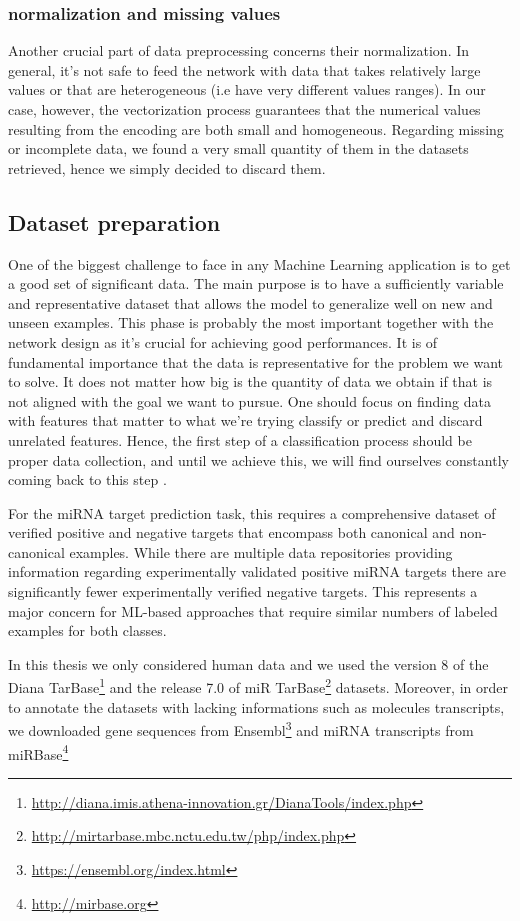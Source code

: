 \subsubsection{normalization and missing values}
Another crucial part of data preprocessing concerns their normalization. In general, it's not safe to feed the network with data that takes relatively large values or that are heterogeneous (i.e have very different values ranges). In our case, however, the vectorization process guarantees that the numerical values resulting from the encoding are both small and homogeneous. Regarding missing or incomplete data, we found a very small quantity  of them in the datasets retrieved, hence we simply decided to discard them.  

\subsection{Dataset preparation}
One of the biggest challenge to face in any Machine Learning application is to get a good set of significant data.
The main purpose is to have a sufficiently variable and representative dataset that allows the model to generalize well on new and unseen examples. This phase is probably the most important together with the network design as it's crucial for achieving good performances. It is of fundamental importance that the data is representative for the problem we want to solve. It does not matter how big is the  quantity of data we obtain if that is not aligned with the goal we want to pursue. One should focus on finding data with features that matter to what we’re trying classify or predict and discard unrelated features. Hence, the first step of a classification process should be proper data collection, and until we achieve this, we will find ourselves constantly coming back to this step \cite{imbalanced_datasets}.

For the miRNA target prediction task, this requires a comprehensive dataset of verified positive and negative targets that encompass both canonical and non-canonical examples. While there are multiple data repositories providing information regarding experimentally validated positive miRNA targets\cite{dianatarbase} \cite{mirtarbase} there are significantly fewer experimentally verified negative targets. This represents a major concern for ML-based approaches that require similar numbers of labeled examples for both classes.

In this thesis we only considered human data and we used the version 8 of the Diana TarBase\footnote{\url{http://diana.imis.athena-innovation.gr/DianaTools/index.php}} and the release 7.0 of miR TarBase\footnote{\url{http://mirtarbase.mbc.nctu.edu.tw/php/index.php}} datasets. Moreover, in order to annotate the datasets with lacking informations such as molecules transcripts, we downloaded gene sequences from Ensembl\footnote{\url{https://ensembl.org/index.html}} and miRNA transcripts from miRBase\footnote{\url{http://mirbase.org}} 

